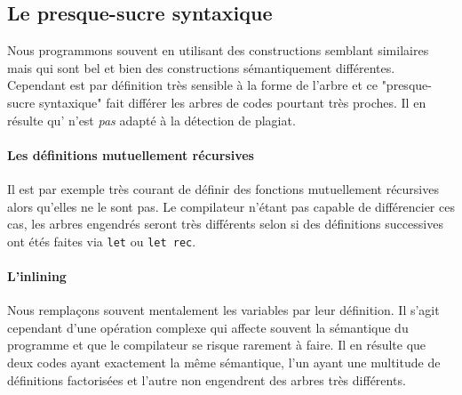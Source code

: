 
\subsection{Le presque-sucre syntaxique}

Nous programmons souvent en utilisant des constructions semblant
similaires mais qui sont bel et bien des constructions sémantiquement
différentes. Cependant {\Asak} est par définition très sensible à la
forme de l'arbre {\LambdaCode} et ce "presque-sucre syntaxique" fait
différer les arbres de codes pourtant très proches. Il en résulte
qu'{\Asak} n'est \emph{pas} adapté à la détection de plagiat.

\paragraph{Les définitions mutuellement récursives}

Il est par exemple très courant de définir des fonctions mutuellement
récursives alors qu'elles ne le sont pas. Le compilateur n'étant pas
capable de différencier ces cas, les arbres engendrés seront très
différents selon si des définitions successives ont étés faites via
\verb|let| ou \verb|let rec|.

\paragraph{L'inlining}

Nous remplaçons souvent mentalement les variables par leur
définition. Il s'agit cependant d'une opération complexe qui affecte
souvent la sémantique du programme et que le compilateur se risque
rarement à faire. Il en résulte que deux codes ayant exactement la
même sémantique, l'un ayant une multitude de définitions factorisées
et l'autre non engendrent des arbres très différents.
